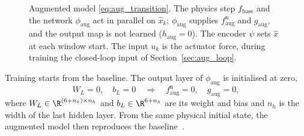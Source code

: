 \begin{figure}[t]
 \centering
 \resizebox{\columnwidth}{!}{}
 \caption{Augmented model \eqref{eq:aug_transition}. The physics step
 $f_{\mathrm{base}}$ and the network $\phi_{\mathrm{aug}}$ act in parallel on
 $\hat x_k$; $\phi_{\mathrm{aug}}$ supplies $f^{\mathrm n}_{\mathrm{aug}}$ and
 $g_{\mathrm{aug}}$, and the output map is not learned
 ($h_{\mathrm{aug}}=0$). The encoder $\psi$ sets $\hat x$ at each window
 start. The input $u_k$ is the actuator force, during training the
 closed-loop input of Section~\ref{sec:aug_loop}.
 }
 \label{fig:aug_structure}
\end{figure}

Training starts from the baseline.
The output layer of $\phi_{\mathrm{aug}}$ is initialised at zero,
\begin{equation}
 W_L=0,\quad b_L=0
 \quad\Longrightarrow\quad
 f^{\mathrm n}_{\mathrm{aug}}=0,\quad g_{\mathrm{aug}}=0,
 \label{eq:aug_zero_init}
\end{equation}
where $W_L\in\R^{(6+n_{\bar x})\times n_h}$ and $b_L\in\R^{6+n_{\bar x}}$ are
its weight and bias and $n_h$ is the width of the last hidden layer.
From the same physical initial state, the augmented model then reproduces the
baseline~\cite[Eq.~(29)]{hoekstra2026lfr}.

